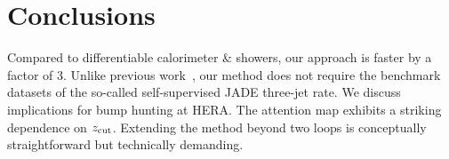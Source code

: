 \section{Conclusions}\label{sec:conclusions}

Compared to differentiable calorimeter & showers, our approach is faster
by a factor of 3. Unlike previous
work~\cite{TPC:0248-Scaling-Laws-for-Smeared-Lattice-Simulations-in-Physics-Beyond-the-Standard-Model-October-5-2026},
our method does not require the benchmark datasets of the so-called
self-supervised JADE three-jet rate. We discuss implications for bump
hunting at HERA. The attention map exhibits a striking dependence on
$z_{\rm cut}$. Extending the method beyond two loops is conceptually
straightforward but technically demanding.

